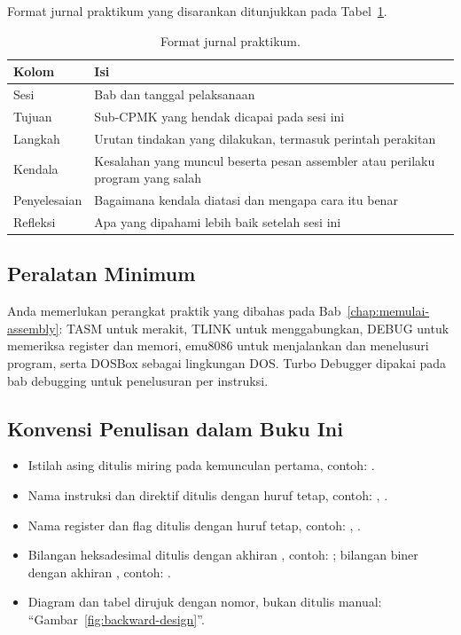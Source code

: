 Format jurnal praktikum yang disarankan ditunjukkan pada
Tabel~\ref{tab:format-jurnal}.

\begin{table}[H]
    \centering
    \caption{Format jurnal praktikum.}
    \label{tab:format-jurnal}
    \small
    \begin{tabular}{@{}p{3.2cm}p{10.2cm}@{}}
        \toprule
        \textbf{Kolom} & \textbf{Isi} \\
        \midrule
        Sesi & Bab dan tanggal pelaksanaan \\
        \addlinespace
        Tujuan & Sub-CPMK yang hendak dicapai pada sesi ini \\
        \addlinespace
        Langkah & Urutan tindakan yang dilakukan, termasuk perintah
        perakitan \\
        \addlinespace
        Kendala & Kesalahan yang muncul beserta pesan assembler atau
        perilaku program yang salah \\
        \addlinespace
        Penyelesaian & Bagaimana kendala diatasi dan mengapa cara itu
        benar \\
        \addlinespace
        Refleksi & Apa yang dipahami lebih baik setelah sesi ini \\
        \bottomrule
    \end{tabular}
\end{table}

\subsection{Peralatan Minimum}

Anda memerlukan perangkat praktik yang dibahas pada
Bab~\ref{chap:memulai-assembly}:
TASM untuk merakit, TLINK untuk menggabungkan, DEBUG untuk memeriksa
register dan memori, emu8086 untuk menjalankan dan menelusuri program,
serta DOSBox sebagai lingkungan DOS. Turbo Debugger dipakai pada bab
debugging untuk penelusuran per instruksi.

\subsection{Konvensi Penulisan dalam Buku Ini}

\begin{itemize}
    \item Istilah asing ditulis miring pada kemunculan pertama, contoh:
          .
    \item Nama instruksi dan direktif ditulis dengan huruf tetap,
          contoh: , .
    \item Nama register dan flag ditulis dengan huruf tetap, contoh:
          , .
    \item Bilangan heksadesimal ditulis dengan akhiran ,
          contoh: ; bilangan biner dengan akhiran
          , contoh: .
    \item Diagram dan tabel dirujuk dengan nomor, bukan ditulis
          manual: ``Gambar~\ref{fig:backward-design}''.
\end{itemize}
